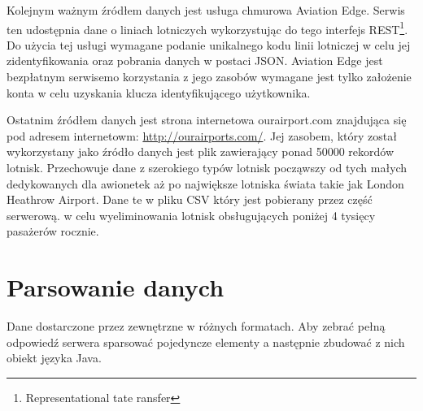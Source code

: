 \documentclass[12pt, twoside]{report}
\begin{document}
Kolejnym ważnym źródłem danych jest usługa chmurowa Aviation Edge. Serwis ten  udostępnia  dane o liniach lotniczych wykorzystując do tego interfejs REST\footnote{Representational tate ransfer}. Do użycia tej usługi wymagane  podanie unikalnego kodu linii lotniczej w celu jej zidentyfikowania oraz pobrania danych w postaci JSON. Aviation Edge jest bezpłatnym serwisemo korzystania z jego zasobów wymagane jest tylko założenie konta w celu uzyskania klucza identyfikującego użytkownika.

Ostatnim źródłem danych jest strona internetowa ourairport.com znajdująca się pod adresem internetowm: \url{http://ourairports.com/}. Jej zasobem, który został wykorzystany jako źródło danych jest plik  zawierający ponad 50000 rekordów  lotnisk. Przechowuje  dane z szerokiego  typów lotnisk począwszy od tych małych dedykowanych dla awionetek\add{,} aż po największe lotniska świata takie jak London Heathrow Airport. Dane te  w  pliku CSV\add{,} który jest pobierany przez część serwerową.  w celu wyeliminowania lotnisk obsługujących poniżej 4 tysięcy pasażerów rocznie.

\section{Parsowanie danych}
Dane dostarczone przez zewnętrzne   w różnych formatach. Aby zebrać pełną odpowiedź serwera   sparsować pojedyncze elementy a następnie zbudować z nich obiekt języka Java.
\end{document}

